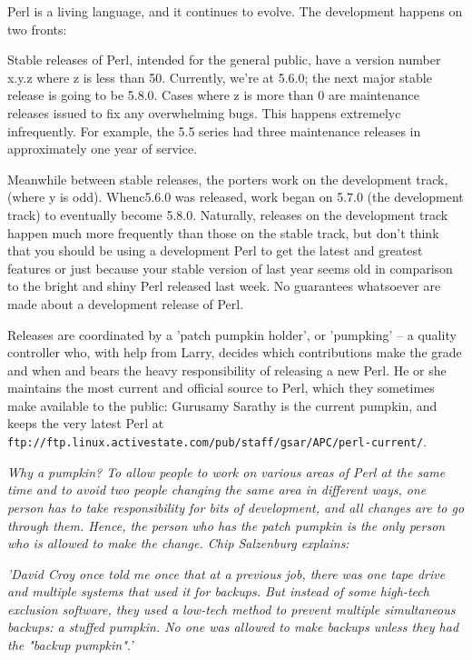 \documentclass[a4paper,11pt]{book}
\begin{document}
\noindent Perl is a living language, and it continues to evolve. The development happens on two fronts:

\noindent 

\noindent Stable releases of Perl, intended for the general public, have a version number x.y.z  where  z  is less than 50. Currently, we're at 5.6.0; the next major stable release is going to be 5.8.0. Cases where z is more than 0 are maintenance releases issued to fix any overwhelming bugs. This happens extremelyc infrequently. For example, the 5.5 series had three maintenance releases in approximately one year of service.

\noindent 

\noindent Meanwhile between stable releases, the porters work on the development track, (where y is odd). Whenc5.6.0 was released, work began on 5.7.0 (the development track) to eventually become 5.8.0. Naturally, releases on the development track happen much more frequently than those on the stable track, but don't think that you should be using a development Perl to get the latest and greatest features or just because your stable version of last year seems old in comparison to the bright and shiny Perl released last week. No guarantees whatsoever are made about a development release of Perl.

\noindent 

\noindent Releases are coordinated by a 'patch pumpkin holder', or 'pumpking' -- a quality controller who, with help from Larry, decides which contributions make the grade and when and bears the heavy responsibility of releasing a new Perl. He or she maintains the most current and official source to Perl, which they sometimes make available to the public: Gurusamy Sarathy is the current pumpkin, and keeps the very latest Perl at \texttt{ftp://ftp.linux.activestate.com/pub/staff/gsar/APC/perl-current/}.

\noindent 

\textit{Why a pumpkin? To allow people to work on various areas of Perl at the same time and to avoid two people changing the same area in different ways, one person has to take responsibility for bits of development, and all changes are to go through them. Hence, the person who has the patch pumpkin is the only person who is allowed to make the change. Chip Salzenburg explains:}

\noindent \textit{'David Croy once told me once that at a previous job, there was one tape drive and multiple systems that used it for backups. But instead of some high-tech exclusion software, they used a low-tech method to prevent multiple simultaneous backups: a stuffed pumpkin. No one was allowed to make backups unless they had the "backup pumpkin".'}
\end{document}
